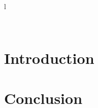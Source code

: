 \documentclass[a4paper]{article}
\title{\underline{\textbf{\begin{Huge}Network\end{Huge}}}\\\vspace{1cm}
    \begin{huge}
        \textbf{Coucou}
    \end{huge}\\}
\author{
        Tom Moulard (16920041)
        \date{}
        }
\begin{document}
l\maketitle
\begin{center}
\vspace{1cm}
\date{2017 March 4}
\vspace{2cm}\\
\end{center}    
    \thispagestyle{empty}

\newpage{}

\tableofcontents
\thispagestyle{empty}



\newpage
\section{Introduction}


\newpage 

\section{Conclusion}

\newpage

\listoffigures
\end{document}
